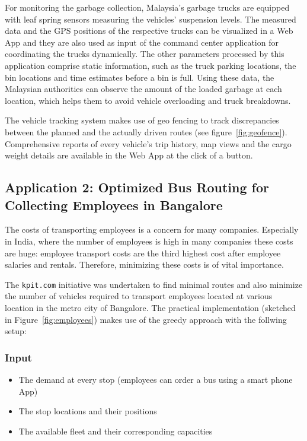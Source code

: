 \documentclass[10pt]{article}
\begin{document}
For monitoring the garbage collection, Malaysia's garbage trucks are equipped with  
leaf spring sensors measuring the vehicles' suspension levels. 
The measured data and the GPS positions of the respective trucks can be visualized 
in a Web App and they are also used as input of the 
command center application for coordinating the trucks dynamically. 
The other parameters processed by this 
application comprise static information, such as the truck parking locations,
the bin locations and time estimates before a bin is full. Using these data,
the Malaysian authorities can observe the amount of the loaded garbage at each 
location, which helps them to avoid vehicle overloading and truck breakdowns.


The vehicle tracking system makes use of geo fencing to track discrepancies between the
planned and the actually driven routes (see figure~\ref{fig:geofence}). 
Comprehensive reports of every vehicle's trip history, map views and the cargo 
weight details are available in the Web App at the click of a button.


\subsection{Application 2: Optimized Bus Routing for Collecting Employees in Bangalore}
\label{sec:Bangalore}

The costs of transporting employees is a concern for many companies. Especially in India, 
where the number of employees is high in many companies these costs are huge: 
employee transport costs are the third highest cost after employee salaries and rentals.
Therefore, minimizing these costs is of vital importance.

The {\tt kpit.com} initiative was undertaken to find minimal routes and also minimize the
number of vehicles required to transport employees located at various location in the 
metro city of Bangalore. The practical implementation (sketched in 
Figure~\ref{fig:employees}) makes use of the greedy approach with the follwing setup:

\subsubsection*{Input}

\begin{itemize}
\item The demand at every stop (employees can order a bus using a smart phone App)
\item The stop locations and their positions
\item The available fleet and their corresponding capacities
\end{itemize}
\end{document}
